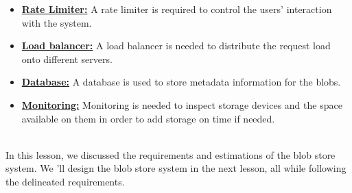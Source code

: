 \begin{itemize}
\item
\protect{}\label{4gOeXJagJhUjMmZLIgg2B}
\href{https://www.educative.io/courses/grokking-the-system-design-interview/system-design-the-rate-limiter}{\textbf{Rate Limiter:}} A rate limiter is required to control the users' interaction with the system.
\item
\protect{}\label{8taOd18lZxXeqZfkafi-j}
\href{https://www.educative.io/courses/grokking-the-system-design-interview/introduction-to-load-balancers}{\textbf{Load balancer:}} A load balancer is needed to distribute the request load onto different servers.
\item
\protect{}\label{-2lxue25x6WiwMsiZCbXQ}
\href{https://www.educative.io/courses/grokking-the-system-design-interview/introduction-to-databases}{\textbf{Database:}} A database is used to store metadata information for the blobs.
\item
\protect{}\label{bQlgADz0svjdvVlRVY-1F}
\href{https://www.educative.io/courses/grokking-the-system-design-interview/system-design-distributed-monitoring}{\textbf{Monitoring:}} Monitoring is needed to inspect storage devices and the space available on them in order to add storage on time if needed.
\end{itemize}
\\
In this lesson, we discussed the requirements and estimations of the blob store system. We 'll design the blob store system in the next lesson, all while following the delineated requirements.

